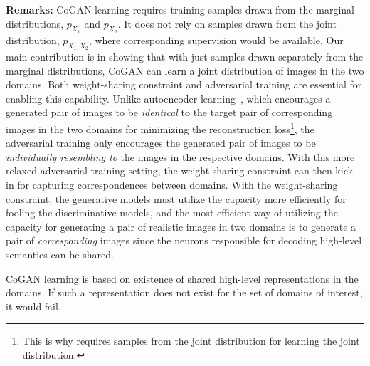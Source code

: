 {\bf Remarks:} CoGAN learning requires training samples drawn from the marginal distributions, $p_{X_1}$ and $p_{X_2}$. It does not rely on samples drawn from the joint distribution, $p_{X_1,X_2}$, where corresponding supervision would be available. Our main contribution is in showing that with just samples drawn separately from the marginal distributions, CoGAN can learn a joint distribution of images in the two domains. Both weight-sharing constraint and adversarial training are essential for enabling this capability. Unlike autoencoder learning~\cite{ngiam2011multimodal}, which encourages a generated pair of images to be {\it identical} to the target pair of corresponding images in the two domains for minimizing the reconstruction loss\footnote{This is why \cite{ngiam2011multimodal} requires samples from the joint distribution for learning the joint distribution.}, the adversarial training only encourages the generated pair of images to be {\it individually resembling to} the images in the respective domains. With this more relaxed adversarial training setting, the weight-sharing constraint can then kick in for capturing correspondences between domains. With the weight-sharing constraint, the generative models must utilize the capacity more efficiently for fooling the discriminative models, and the most efficient way of utilizing the capacity for generating a pair of realistic images in two domains is to generate a pair of {\it corresponding} images since the neurons responsible for decoding high-level semantics can be shared. 

CoGAN learning is based on existence of shared high-level representations in the domains. If such a representation does not exist for the set of domains of interest, it would fail.

